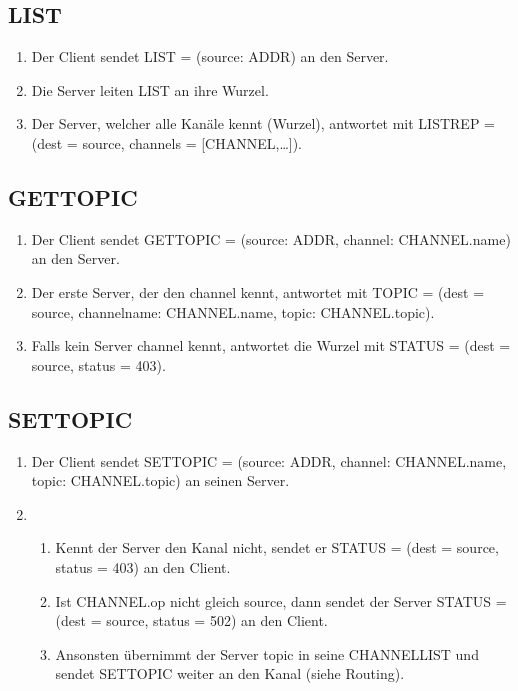 \documentclass{article}
\begin{document}
\subsection{LIST}

\begin{enumerate}
  \item Der Client sendet LIST = (source: ADDR) an den Server.
  \item Die Server leiten LIST an ihre Wurzel. 
  \item Der Server, welcher alle Kanäle kennt (Wurzel), antwortet mit LISTREP = (dest = source, channels = [CHANNEL,\ldots]).
\end{enumerate}

\subsection{GETTOPIC}

\begin{enumerate}
  \item Der Client sendet GETTOPIC = (source: ADDR, channel: CHANNEL.name) an den Server.
  \item Der erste Server, der den channel kennt, antwortet mit TOPIC = (dest = source, channelname: CHANNEL.name, topic: CHANNEL.topic).
  \item Falls kein Server channel kennt, antwortet die Wurzel mit STATUS = (dest = source, status = 403).
\end{enumerate}

\subsection{SETTOPIC}

\begin{enumerate}
  \item Der Client sendet SETTOPIC = (source: ADDR, channel: CHANNEL.name, topic: CHANNEL.topic) an seinen Server.
  \item
    \begin{enumerate}
      \item Kennt der Server den Kanal nicht, sendet er STATUS = (dest = source, status = 403) an den Client.
      \item Ist CHANNEL.op nicht gleich source, dann sendet der Server STATUS = (dest = source, status = 502) an den Client.
      \item Ansonsten übernimmt der Server topic in seine CHANNELLIST und sendet SETTOPIC weiter an den Kanal (siehe Routing).
    \end{enumerate}
\end{enumerate}
\end{document}
